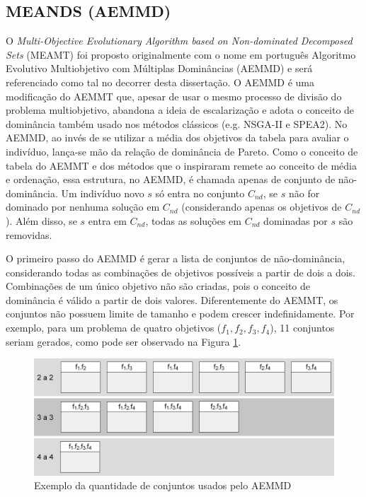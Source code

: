 \subsection{MEANDS (AEMMD)}
\label{section_aemmd}

O \textit{Multi-Objective Evolutionary Algorithm based on Non-dominated Decomposed Sets} (MEAMT) \cite{Lafeta2016} foi proposto originalmente com o nome em português Algoritmo Evolutivo Multiobjetivo com Múltiplas Dominâncias (AEMMD) e será referenciado como tal no decorrer desta dissertação. O AEMMD é uma modificação do AEMMT que, apesar de usar o mesmo processo de divisão do problema multiobjetivo, abandona a ideia de escalarização e adota o conceito de dominância também usado nos métodos clássicos (e.g. NSGA-II e SPEA2). No AEMMD, ao invés de se utilizar a média dos objetivos da tabela para avaliar o indivíduo, lança-se mão da relação de dominância de Pareto. Como o conceito de tabela do AEMMT e dos métodos que o inspiraram remete ao conceito de média e ordenação, essa estrutura, no AEMMD, é chamada apenas de conjunto de não-dominância. Um indivíduo novo $s$ só entra no conjunto $C_{nd}$, se $s$ não for dominado por nenhuma solução em $C_{nd}$ (considerando apenas os objetivos de $C_{nd}$). Além disso, se $s$ entra em $C_{nd}$, todas as soluções em $C_{nd}$ dominadas por $s$ são removidas.

O primeiro passo do AEMMD é gerar a lista de conjuntos de não-dominância, considerando todas as combinações de objetivos possíveis a partir de dois a dois. Combinações de um único objetivo não são criadas, pois o conceito de dominância é válido a partir de dois valores. Diferentemente do AEMMT, os conjuntos não possuem limite de tamanho e podem crescer indefinidamente. Por exemplo, para um problema de quatro objetivos ($f_1, f_2, f_3, f_4$), 11 conjuntos seriam gerados, como pode ser observado na Figura \ref{fig_aemmd_tabelas}.

\begin{figure}[!htbp]
	\label{fig_aemmd_tabelas}
	\centering
	\includegraphics[width=1\textwidth]{cap_otimizacao-multi/figs/aeemd-tabelas}
	\caption{Exemplo da quantidade de conjuntos usados pelo AEMMD}
\end{figure}

